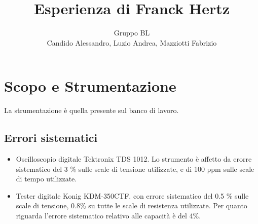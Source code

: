 \documentclass[a4paper,10pt]{article}
\title{Esperienza di Franck Hertz}
\author{Gruppo BL \\ Candido Alessandro, Luzio Andrea, Mazziotti Fabrizio}
\begin{document}
\maketitle


\section{Scopo e Strumentazione}
La strumentazione è quella presente sul banco di lavoro.

\subsection{Errori sistematici}

\begin{itemize}

 \item Oscilloscopio digitale Tektronix TDS 1012. \newline
 		Lo strumento è affetto da erorre sistematico del 3 \% sulle scale di tensione utilizzate, e di 100 ppm sulle scale di tempo utilizzate.
 \item Tester digitale Konig KDM-350CTF. \newline con errore sistematico del 0.5 \% sulle scale di tensione, 0.8\% su tutte le scale di resistenza utilizzate. Per quanto riguarda l'errore sistematico relativo alle capacità è del 4\%.

\end{itemize}

\section{}
\end{document}
